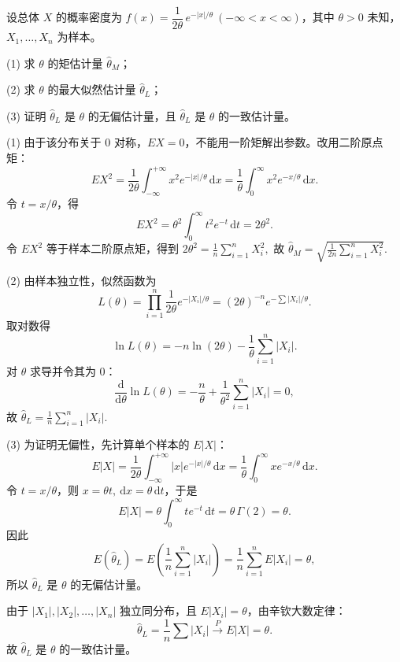 \documentclass[lang=cn,11pt]{elegantbook}
\begin{document}
\begin{exercise}\label{exer:7-laplace}\label{exer:src-2013-a-08-mle}\label{exer:src-probstat-test1-07}
设总体 \(X\) 的概率密度为 \(f(x) = \dfrac{1}{2\theta}\,e^{-|x|/\theta}\ (-\infty < x < \infty)\)，其中 \(\theta > 0\) 未知，\(X_1, \dots, X_n\) 为样本。\par
(1) 求 \(\theta\) 的矩估计量 \(\hat{\theta}_M\)；\par
(2) 求 \(\theta\) 的最大似然估计量 \(\hat{\theta}_L\)；\par
(3) 证明 \(\hat{\theta}_L\) 是 \(\theta\) 的无偏估计量，且 \(\hat{\theta}_L\) 是 \(\theta\) 的一致估计量。
\end{exercise}
\begin{solution}
(1) 由于该分布关于 \(0\) 对称，\(EX=0\)，不能用一阶矩解出参数。改用二阶原点矩：
\[
EX^2
=\frac{1}{2\theta}\int_{-\infty}^{+\infty}x^2e^{-|x|/\theta}\,\mathrm{d}x
=\frac1\theta\int_0^\infty x^2e^{-x/\theta}\,\mathrm{d}x.
\]
令 \(t=x/\theta\)，得
\[
EX^2
=\theta^2\int_0^\infty t^2e^{-t}\,\mathrm{d}t
=2\theta^2.
\]
令 \(EX^2\) 等于样本二阶原点矩，得到
\(
2\theta^2=\frac1n\sum_{i=1}^{n}X_i^2,
\)
故
\(
\hat{\theta}_M=\sqrt{\frac{1}{2n}\sum_{i=1}^{n}X_i^2}.
\)

(2) 由样本独立性，似然函数为
\[
L(\theta)=\prod_{i=1}^{n}\frac{1}{2\theta}e^{-|X_i|/\theta}
=(2\theta)^{-n}e^{-\sum|X_i|/\theta}.
\]
取对数得
\[
\ln L(\theta)=-n\ln(2\theta)-\frac{1}{\theta}\sum_{i=1}^{n}|X_i|.
\]
对 \(\theta\) 求导并令其为 0：
\[
\frac{\mathrm d}{\mathrm d\theta}\ln L(\theta)
=-\frac{n}{\theta}+\frac{1}{\theta^2}\sum_{i=1}^{n}|X_i|=0,
\]
故
\(
\hat{\theta}_L=\frac{1}{n}\sum_{i=1}^{n}|X_i|.
\)

(3) 为证明无偏性，先计算单个样本的 \(E|X|\)：
\[
E|X|
=\frac{1}{2\theta}\int_{-\infty}^{+\infty}|x|e^{-|x|/\theta}\,\mathrm{d}x
=\frac{1}{\theta}\int_0^\infty xe^{-x/\theta}\,\mathrm{d}x.
\]
令 \(t=x/\theta\)，则 \(x=\theta t,\ \mathrm dx=\theta\,\mathrm dt\)，于是
\[
E|X|=\theta\int_0^\infty te^{-t}\,\mathrm{d}t=\theta\,\Gamma(2)=\theta.
\]
因此
\[
E(\hat{\theta}_L)=E\!\left(\frac1n\sum_{i=1}^{n}|X_i|\right)=\frac1n\sum_{i=1}^{n}E|X_i|=\theta,
\]
所以 \(\hat{\theta}_L\) 是 \(\theta\) 的无偏估计量。

由于 \(|X_1|,|X_2|,\dots,|X_n|\) 独立同分布，且 \(E|X_i|=\theta\)，由辛钦大数定律：
\[
\hat{\theta}_L = \frac{1}{n}\sum|X_i| \xrightarrow{P} E|X| = \theta. 
\]
故 \(\hat{\theta}_L\) 是 \(\theta\) 的一致估计量。
\end{solution}
\end{document}
